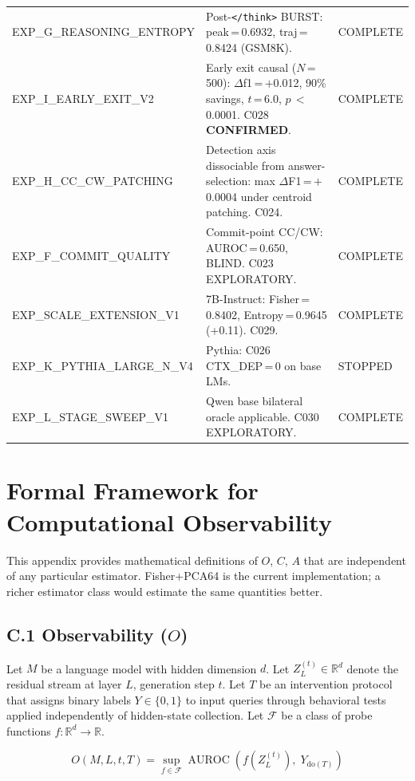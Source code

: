 \documentclass[11pt]{article}
\begin{document}
\begin{table}[h!]
\begin{tabular}{L{4cm}L{7.5cm}l}
EXP\_G\_REASONING\_ENTROPY & Post-\texttt{</think>} BURST: peak\,=\,0.6932, traj\,=\,0.8424 (GSM8K). & COMPLETE \\
EXP\_I\_EARLY\_EXIT\_V2 & Early exit causal ($N$\,=\,500): $\Delta$f1\,=\,$+$0.012, 90\% savings, $t$\,=\,6.0, $p$\,$<$\,0.0001. C028 \textbf{CONFIRMED}. & COMPLETE \\
EXP\_H\_CC\_CW\_PATCHING & Detection axis dissociable from answer-selection: max $\Delta$F1\,=\,$+$0.0004 under centroid patching. C024. & COMPLETE \\
EXP\_F\_COMMIT\_QUALITY & Commit-point CC/CW: AUROC\,=\,0.650, BLIND. C023 EXPLORATORY. & COMPLETE \\
EXP\_SCALE\_EXTENSION\_V1 & 7B-Instruct: Fisher\,=\,0.8402, Entropy\,=\,0.9645 (+0.11). C029. & COMPLETE \\
EXP\_K\_PYTHIA\_LARGE\_N\_V4 & Pythia: C026 CTX\_DEP\,=\,0 on base LMs. & STOPPED \\
EXP\_L\_STAGE\_SWEEP\_V1 & Qwen base bilateral oracle applicable. C030 EXPLORATORY. & COMPLETE \\
\bottomrule
\end{tabular}
\end{table}

\section{Formal Framework for Computational Observability}
\label{app:formal}

This appendix provides mathematical definitions of $O$, $C$, $A$ that are
independent of any particular estimator. Fisher+PCA64 is the current implementation;
a richer estimator class would estimate the same quantities better.

\subsection*{C.1 Observability ($O$)}

Let $M$ be a language model with hidden dimension $d$. Let
$Z_L^{(t)} \in \mathbb{R}^d$ denote the residual stream at layer $L$, generation
step $t$. Let $T$ be an intervention protocol that assigns binary labels
$Y \in \{0,1\}$ to input queries through behavioral tests applied independently of
hidden-state collection. Let $\mathcal{F}$ be a class of probe functions
$f : \mathbb{R}^d \to \mathbb{R}$.

\begin{equation}
O(M, L, t, T) = \sup_{f \in \mathcal{F}} \operatorname{AUROC}(f(Z_L^{(t)}),\; Y_{\mathrm{do}(T)})
\end{equation}
\end{document}
